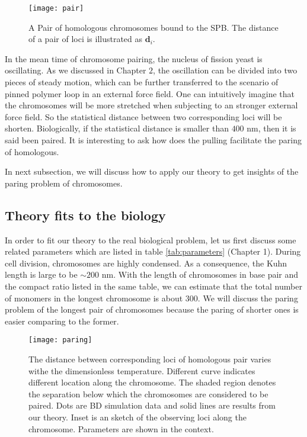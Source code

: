 \begin{figure}[htpb]
    \centering
    \texttt{[image: pair]}
    \caption{A Pair of homologous chromosomes bound to the SPB. The distance of a pair of loci is illustrated as $\mathbf{d}_i$. }
    \label{fig:pair}
\end{figure}

In the mean time of chromosome pairing, the nucleus of fission yeast is oscillating. As we discussed in Chapter $2$, the oscillation can be divided into two pieces of steady motion, which can be further transferred to the scenario of pinned polymer loop in an external force field. One can intuitively imagine that the chromosomes will be more stretched when subjecting to an stronger external force field. So the statistical distance between two corresponding loci will be shorten. Biologically, if the statistical distance is smaller than $400$ nm, then it is said been paired. It is interesting to ask how does the pulling facilitate the paring of homologous. 

In next subsection, we will discuss how to apply our theory to get insights of the paring problem of chromosomes. 

\subsection{Theory fits to the biology}
\label{sub:theory_fits_to_the_biology}

In order to fit our theory to the real biological problem, let us first discuss some related parameters which are listed in table \ref{tab:parameters} (Chapter 1). During cell division, chromosomes are highly condensed. As a consequence, the Kuhn length is large to be $\sim 200$ nm. With the length of chromosomes in base pair and the compact ratio listed in the same table, we can estimate that the total number of monomers in the longest chromosome is about $300$. We will discuss the paring problem of the longest pair of chromosomes because the paring of shorter ones is easier comparing to the former. 
\begin{figure}[htpb]
    \centering
    \texttt{[image: paring]}
    \caption{The distance between corresponding loci of homologous pair varies withe the dimensionless temperature. Different curve indicates different location along the chromosome. The shaded region denotes the separation below which the chromosomes are considered to be paired. Dots are BD simulation data and solid lines are results from our theory. Inset is an sketch of the observing loci along the chromosome. Parameters are shown in the context.}
    \label{fig:paring}
\end{figure}

